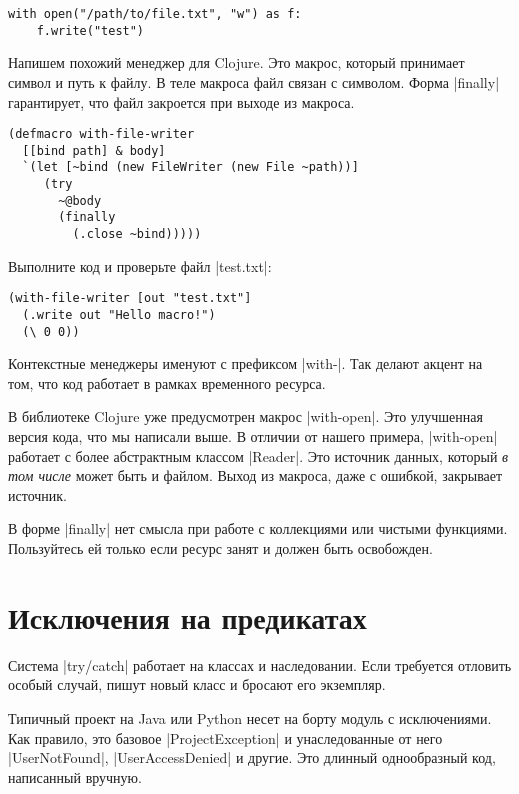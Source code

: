 \begin{verbatim}
with open("/path/to/file.txt", "w") as f:
    f.write("test")
\end{verbatim}

Напишем похожий менеджер для Clojure. Это макрос, который принимает символ и
путь к файлу. В теле макроса файл связан с символом. Форма \spverb|finally|
гарантирует, что файл закроется при выходе из макроса.

\begin{verbatim}
(defmacro with-file-writer
  [[bind path] & body]
  `(let [~bind (new FileWriter (new File ~path))]
     (try
       ~@body
       (finally
         (.close ~bind)))))
\end{verbatim}


\noindent
Выполните код и проверьте файл \spverb|test.txt|:

\begin{verbatim}
(with-file-writer [out "test.txt"]
  (.write out "Hello macro!")
  (\ 0 0))
\end{verbatim}

Контекстные менеджеры именуют с префиксом \spverb|with-|. Так делают акцент на
том, что код работает в рамках временного ресурса.

В библиотеке Clojure уже предусмотрен макрос \spverb|with-open|. Это улучшенная
версия кода, что мы написали выше. В отличии от нашего примера,
\spverb|with-open| работает с более абстрактным классом \spverb|Reader|. Это
источник данных, который \emph{в том числе} может быть и файлом. Выход из
макроса, даже с ошибкой, закрывает источник.

В форме \spverb|finally| нет смысла при работе с коллекциями или чистыми
функциями. Пользуйтесь ей только если ресурс занят и должен быть освобожден.

\section{Исключения на предикатах}

Система \spverb|try/catch| работает на классах и наследовании. Если требуется
отловить особый случай, пишут новый класс и бросают его экземпляр.

Типичный проект на Java или Python несет на борту модуль с исключениями. Как
правило, это базовое \spverb|ProjectException| и унаследованные от него
\spverb|UserNotFound|, \spverb|UserAccessDenied| и другие. Это длинный
однообразный код, написанный вручную.


